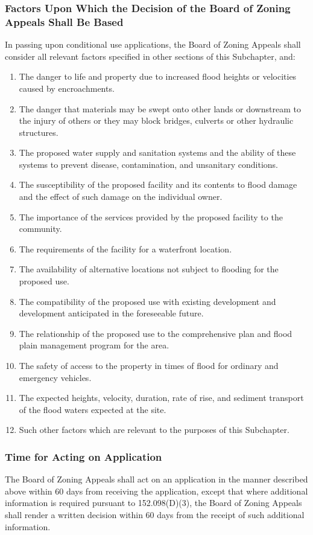 \subsubsection{Factors Upon Which the Decision of the Board of Zoning Appeals Shall Be Based}
In passing upon conditional use applications, the Board of Zoning Appeals shall consider all relevant factors specified in other sections of this Subchapter, and:
\begin{enumerate}[{\indent}a)]
    \item The danger to life and property due to increased flood heights or velocities caused by encroachments.
    \item The danger that materials may be swept onto other lands or downstream to the injury of others or they may block bridges, culverts or other hydraulic structures.
    \item The proposed water supply and sanitation systems and the ability of these systems to prevent disease, contamination, and unsanitary conditions.
    \item The susceptibility of the proposed facility and its contents to flood damage and the effect of such damage on the individual owner.
    \item The importance of the services provided by the proposed facility to the community.
    \item The requirements of the facility for a waterfront location.
    \item The availability of alternative locations not subject to flooding for the proposed use.
    \item The compatibility of the proposed use with existing development and development anticipated in the foreseeable future.
    \item The relationship of the proposed use to the comprehensive plan and flood plain management program for the area.
    \item The safety of access to the property in times of flood for ordinary and emergency vehicles.
    \item The expected heights, velocity, duration, rate of rise, and sediment transport of the flood waters expected at the site.
    \item Such other factors which are relevant to the purposes of this Subchapter.
\end{enumerate}
\subsubsection{Time for Acting on Application}
The Board of Zoning Appeals shall act on an application in the manner described above within 60 days from receiving the application, except that where additional information is required pursuant to 152.098(D)(3), the Board of Zoning Appeals shall render a written decision within 60 days from the receipt of such additional information.
